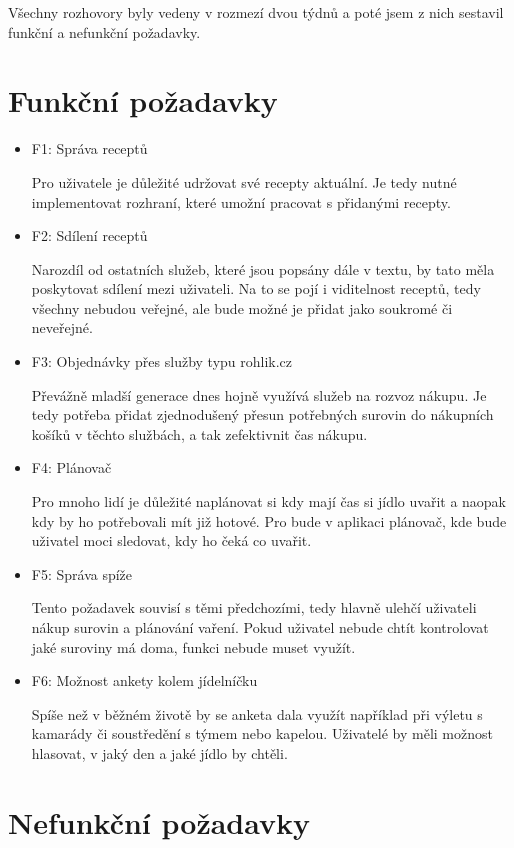 Všechny rozhovory byly vedeny v rozmezí dvou týdnů a poté jsem z nich sestavil funkční a nefunkční požadavky.

\section{Funkční požadavky}


\begin{itemize}
    \item F1: Správa receptů

    Pro uživatele je důležité udržovat své recepty aktuální. Je tedy nutné implementovat rozhraní, které umožní pracovat s
    přidanými recepty.
    \item F2: Sdílení receptů

    Narozdíl od ostatních služeb, které jsou popsány dále v textu, by tato měla poskytovat sdílení mezi uživateli. Na to se pojí i
    viditelnost receptů, tedy všechny nebudou veřejné, ale bude možné je přidat jako soukromé či neveřejné.
    \item F3: Objednávky přes služby typu rohlik.cz

    Převážně mladší generace dnes hojně využívá služeb na rozvoz nákupu. Je tedy potřeba přidat zjednodušený přesun potřebných
    surovin do nákupních košíků v těchto službách, a tak zefektivnit čas nákupu.
    \item F4: Plánovač

    Pro mnoho lidí je důležité naplánovat si kdy mají čas si jídlo uvařit a naopak kdy by ho potřebovali mít již hotové. Pro bude v
    aplikaci plánovač, kde bude uživatel moci sledovat, kdy ho čeká co uvařit.
    \item F5: Správa spíže

    Tento požadavek souvisí s těmi předchozími, tedy hlavně ulehčí uživateli nákup surovin a plánování vaření. Pokud uživatel nebude chtít
    kontrolovat jaké suroviny má doma, funkci nebude muset využít.
    \item F6: Možnost ankety kolem jídelníčku

    Spíše než v běžném životě by se anketa dala využít například při výletu s kamarády či soustředění s týmem nebo kapelou. Uživatelé
    by měli možnost hlasovat, v jaký den a jaké jídlo by chtěli.
\end{itemize}

\section{Nefunkční požadavky}

